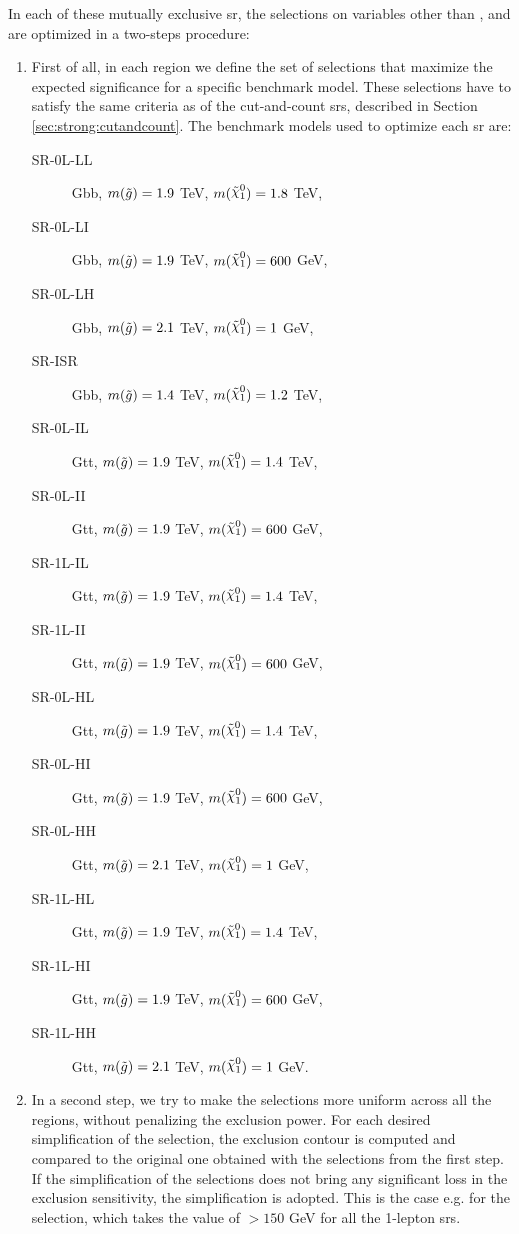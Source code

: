 In each of these mutually exclusive \gls{sr}, the selections on variables other than \njet, \nlep and \meff are optimized in a two-steps procedure:
\begin{enumerate}
\item First of all, in each region we define the set of selections that maximize the expected significance for a specific benchmark model. 
These selections have to satisfy the same criteria as of the cut-and-count \glspl{sr}, described in Section \ref{sec:strong:cutandcount}.
The benchmark models used to optimize each \gls{sr} are:
\begin{description}
\item[SR-0L-LL] Gbb, $m(\tilde{g}) = 1.9$ TeV, $m(\ninoone) = 1.8$ TeV,
\item[SR-0L-LI] Gbb, $m(\tilde{g}) = 1.9$ TeV, $m(\ninoone) = 600$ GeV,
\item[SR-0L-LH] Gbb, $m(\tilde{g}) = 2.1$ TeV, $m(\ninoone) = 1$ GeV,
\item[SR-ISR]   Gbb, $m(\tilde{g}) = 1.4$ TeV, $m(\ninoone) = 1.2$ TeV,

\item[SR-0L-IL] Gtt, $m(\tilde{g}) = 1.9$ TeV, $m(\ninoone) = 1.4$ TeV,
\item[SR-0L-II] Gtt, $m(\tilde{g}) = 1.9$ TeV, $m(\ninoone) = 600$ GeV,

\item[SR-1L-IL] Gtt, $m(\tilde{g}) = 1.9$ TeV, $m(\ninoone) = 1.4$ TeV,
\item[SR-1L-II] Gtt, $m(\tilde{g}) = 1.9$ TeV, $m(\ninoone) = 600$ GeV,

\item[SR-0L-HL] Gtt, $m(\tilde{g}) = 1.9$ TeV, $m(\ninoone) = 1.4$ TeV,
\item[SR-0L-HI] Gtt, $m(\tilde{g}) = 1.9$ TeV, $m(\ninoone) = 600$ GeV,
\item[SR-0L-HH] Gtt, $m(\tilde{g}) = 2.1$ TeV, $m(\ninoone) = 1$ GeV,

\item[SR-1L-HL] Gtt, $m(\tilde{g}) = 1.9$ TeV, $m(\ninoone) = 1.4$ TeV,
\item[SR-1L-HI] Gtt, $m(\tilde{g}) = 1.9$ TeV, $m(\ninoone) = 600$ GeV,
\item[SR-1L-HH] Gtt, $m(\tilde{g}) = 2.1$ TeV, $m(\ninoone) = 1$ GeV. 

\end{description}


\item In a second step, we try to make the selections more uniform across all the regions, without penalizing the exclusion power. 
For each desired simplification of the selection, the exclusion contour is computed and compared to the original one obtained with the selections from the first step. If the simplification of the selections does not bring any significant loss in the exclusion sensitivity, the simplification is adopted. This is the case e.g. for the \mt selection, which takes the value of $>150$ GeV for all the 1-lepton \glspl{sr}.
\end{enumerate}



